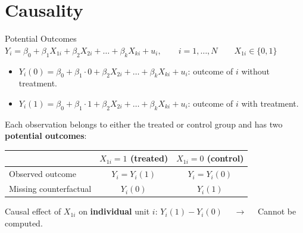 \documentclass[9pt,aspectratio=169]{beamer}
\begin{document}
\section{Causality}

\begin{frame}{Potential Outcomes}
  $
    Y_i = \beta_0 + \beta_1 X_{1i} + \beta_2 X_{2i} + \dots + \beta_k X_{ki} + u_i, 
    \qquad i=1,\dots,N
    \qquad X_{1i} \in \{0,1\}
  $
  \begin{itemize}
    \item $Y_i(0) = \beta_0 + \beta_1 \cdot 0 + \beta_2 X_{2i} + \dots + \beta_k X_{ki} + u_i$: outcome of $i$ without treatment.
    \item $Y_i(1) = \beta_0 + \beta_1 \cdot 1 + \beta_2 X_{2i} + \dots + \beta_k X_{ki} + u_i$: outcome of $i$ with treatment.
  \end{itemize}
  \pause
  \vspace{0.3cm}
  Each observation belongs to either the treated or control group and has two \textbf{potential outcomes}:
  \begin{center}
    \begin{tabular}{@{}lcc@{}}
      \toprule
      & $X_{1i}=1$ (treated) & $X_{1i}=0$ (control) \\
      \midrule
      Observed outcome  & $Y_i=Y_i(1)$ & $Y_i=Y_i(0)$ \\
      \textcolor{red!70!black}{Missing counterfactual} & \textcolor{red!70!black}{$Y_i(0)$} & \textcolor{red!70!black}{$Y_i(1)$} \\
      \bottomrule
    \end{tabular}
  \end{center}
  \vspace{0.3cm}
  Causal effect of $X_{1i}$ on \textbf{individual} unit $i$: \quad $Y_i(1) - Y_i(0)$
   $\quad \rightarrow \quad$
    Cannot be computed.
\end{frame}
\end{document}
